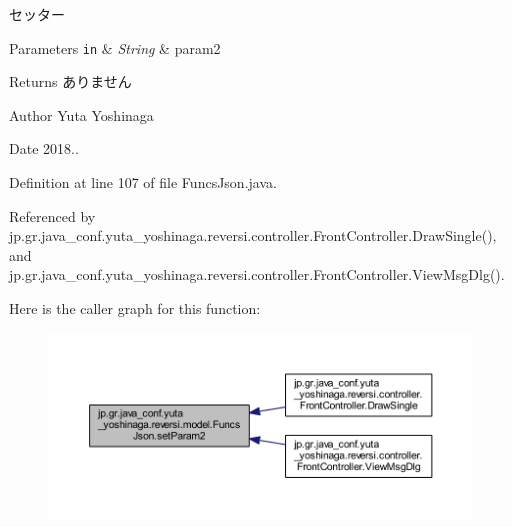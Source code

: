 セッター 


\begin{DoxyParams}[1]{Parameters}
\mbox{\tt in}  & {\em String} & param2 \\
\hline
\end{DoxyParams}
\begin{DoxyReturn}{Returns}
ありません 
\end{DoxyReturn}
\begin{DoxyAuthor}{Author}
Yuta Yoshinaga 
\end{DoxyAuthor}
\begin{DoxyDate}{Date}
2018.. 
\end{DoxyDate}


Definition at line 107 of file Funcs\+Json.\+java.



Referenced by jp.\+gr.\+java\+\_\+conf.\+yuta\+\_\+yoshinaga.\+reversi.\+controller.\+Front\+Controller.\+Draw\+Single(), and jp.\+gr.\+java\+\_\+conf.\+yuta\+\_\+yoshinaga.\+reversi.\+controller.\+Front\+Controller.\+View\+Msg\+Dlg().

Here is the caller graph for this function\+:
\nopagebreak
\begin{figure}[H]
\begin{center}
\leavevmode
\includegraphics[width=350pt]{classjp_1_1gr_1_1java__conf_1_1yuta__yoshinaga_1_1reversi_1_1model_1_1_funcs_json_aa1d17801d47f0d701f6792fa5f06e435_icgraph}
\end{center}
\end{figure}
\mbox{\label{classjp_1_1gr_1_1java__conf_1_1yuta__yoshinaga_1_1reversi_1_1model_1_1_funcs_json_a27bc732004c573269cb63e71c1d1abcc}} 
